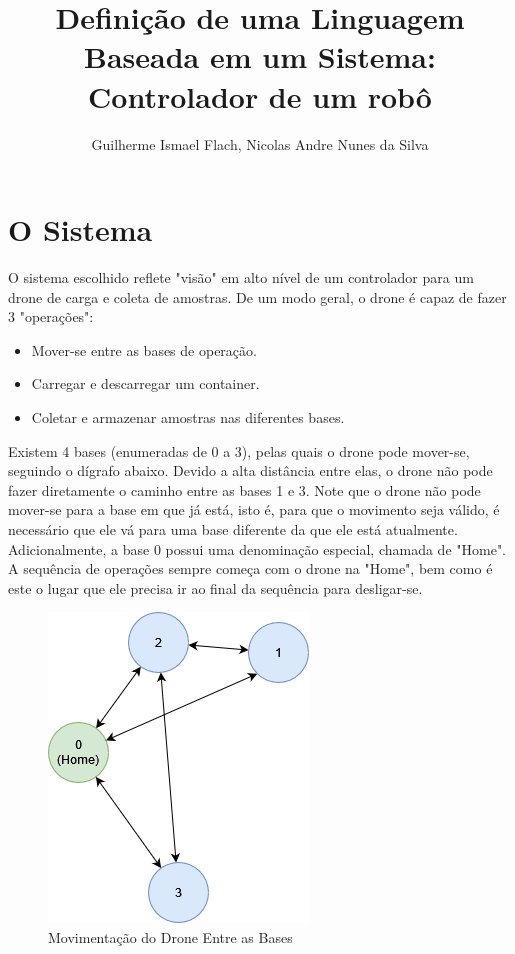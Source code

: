 \documentclass[12pt]{article}
\title{Definição de uma Linguagem Baseada em um Sistema: \\ Controlador de um robô}
\author{Guilherme Ismael Flach, Nicolas Andre Nunes da Silva}
\begin{document}
 

\maketitle

\section{O Sistema}

O sistema escolhido reflete  "visão" em alto nível de um controlador para um drone de carga e coleta de amostras. De um modo geral, o drone é capaz de fazer 3 "operações":

\begin{itemize}
  \item Mover-se entre as bases de operação.
  \item Carregar e descarregar um container.
  \item Coletar e armazenar amostras nas diferentes bases.
\end{itemize}

Existem 4 bases (enumeradas de 0 a 3), pelas quais o drone pode mover-se, seguindo o dígrafo abaixo. Devido a alta distância entre elas, o drone não pode fazer diretamente o caminho entre as bases 1 e 3. Note que o drone não pode mover-se para a base em que já está, isto é, para que o movimento seja válido, é necessário que ele vá para uma base diferente da que ele está atualmente. Adicionalmente, a base 0 possui uma denominação especial, chamada de "Home". A sequência de operações sempre começa com o drone na "Home", bem como é este o lugar que ele precisa ir ao final da sequência para desligar-se.

\begin{figure}[ht]
\centering
\includegraphics[width=.5\textwidth]{automatos.png}
\caption{Movimentação do Drone Entre as Bases}
\label{fig:Movimentos do Drone}
\end{figure}
\end{document}

